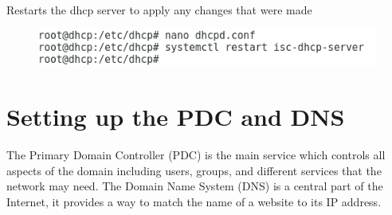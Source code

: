 \documentclass{article}
\begin{document}
\subsection{}
Restarts the dhcp server to apply any changes that were made
\begin{figure}[h]
	\centering
	\includegraphics[width=1\linewidth]{dhcp-config4}
\end{figure}
	\section{Setting up the PDC and DNS}
	\label{sec:10.1}
The Primary Domain Controller (PDC) is the main service which controls all aspects of the domain including users, groups, and different services that the network may need.
The Domain Name System (DNS) is a central part of the Internet, it provides a way to match the name of a website to its IP address.
\end{document}
